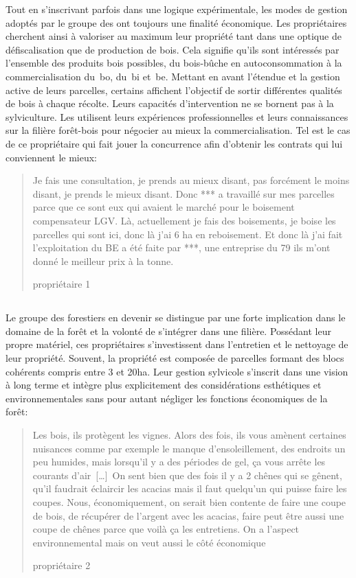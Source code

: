 \documentclass[12pt]{report}
\begin{document}
Tout en s’inscrivant parfois dans une logique expérimentale, les modes de
gestion adoptés par le groupe des  ont toujours une
finalité économique. Les propriétaires cherchent ainsi à valoriser au maximum
leur propriété tant dans une optique de défiscalisation que de production de
bois. Cela signifie qu’ils sont intéressés par l’ensemble des produits bois
possibles, du bois-bûche en autoconsommation à la commercialisation du~\gls{bo},
du~\gls{bi} et~\gls{be}. Mettant en avant l’étendue et
la gestion active de leurs parcelles, certains affichent l’objectif de sortir
différentes qualités de bois à chaque récolte. Leurs capacités d'intervention ne
se bornent pas à la sylviculture. Les
 utilisent leurs expériences professionnelles
et leurs connaissances sur la filière forêt-bois pour négocier au mieux la
commercialisation. Tel est le
cas de ce propriétaire qui fait jouer la concurrence afin d’obtenir les contrats
qui lui conviennent le mieux:

\blockquote[propriétaire 1]{Je fais une
consultation, je prends au mieux disant, pas forcément le
moins disant, je prends le mieux disant. Donc *** a travaillé sur mes
parcelles parce que ce sont eux qui avaient le marché pour le boisement
compensateur LGV. Là, actuellement je fais des boisements, je boise les
parcelles qui sont ici, donc là j’ai 6 ha en reboisement. Et donc là j’ai fait
l’exploitation du BE a été faite par ***, une entreprise du 79 ils m’ont
donné le meilleur prix à la tonne.}

\subsection{}

Le groupe des forestiers en devenir se distingue par une forte implication dans
le domaine de la forêt et la volonté de s'intégrer dans une filière. Possédant
leur propre matériel, ces propriétaires s’investissent dans l’entretien et le
nettoyage de leur propriété. Souvent, la propriété est composée de parcelles formant des
blocs cohérents compris entre 3 et 20ha. Leur gestion sylvicole s’inscrit dans
une vision à long terme et intègre plus explicitement des considérations
esthétiques et environnementales sans pour autant négliger les fonctions
économiques de la forêt:

\blockquote[propriétaire 2]{Les bois, ils protègent les vignes. Alors des fois,
ils vous amènent certaines nuisances comme par exemple le manque d’ensoleillement,
des endroits un peu humides, mais lorsqu’il y a des périodes de gel, ça vous
arrête les courants d’air~[\ldots]~On sent bien que des fois
il y a 2 chênes qui se gênent, qu’il faudrait éclaircir les acacias
mais il faut quelqu’un qui puisse faire les coupes. Nous, économiquement, on serait bien contente de
faire une coupe de bois, de récupérer de l’argent avec les
acacias, faire peut être aussi une coupe de chênes parce que voilà ça les
entretiens. On a l’aspect environnemental mais on veut aussi le côté économique}
\end{document}
